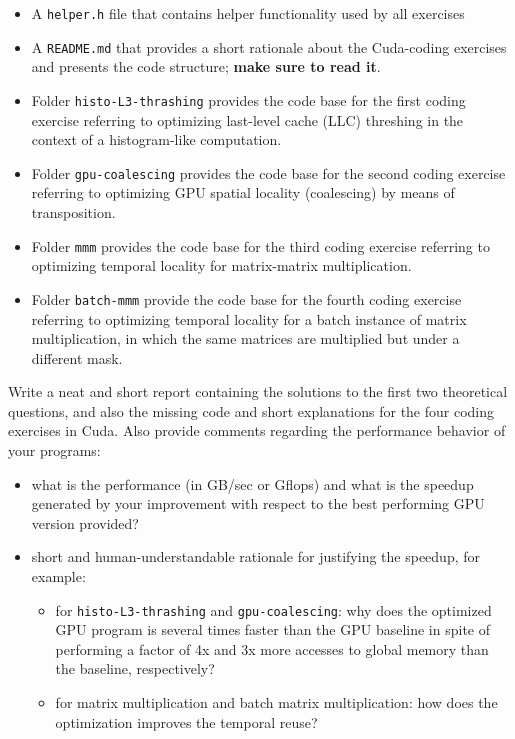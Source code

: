 \documentclass{article}
\begin{document}
\begin{itemize}
    \item A \texttt{helper.h} file that contains helper functionality used by all exercises
    \item A \texttt{README.md} that provides a short rationale about the Cuda-coding exercises and presents the code structure; \textbf{make sure to read it}.
    \item Folder \texttt{histo-L3-thrashing} provides the code base for the first coding exercise referring to optimizing last-level cache (LLC) threshing in the context of a histogram-like computation.
    \item Folder \texttt{gpu-coalescing} provides the code base for the second coding exercise referring to optimizing GPU spatial locality (coalescing) by means of transposition.
    \item Folder \texttt{mmm} provides the code base for the third coding exercise referring to optimizing temporal locality for matrix-matrix multiplication.
    \item Folder \texttt{batch-mmm} provide the code base for the fourth coding exercise referring to optimizing temporal locality for a batch instance of matrix multiplication, in which the same matrices are multiplied but under a different mask.
\end{itemize}

Write a neat and short report containing the solutions to the first two theoretical
questions, and also the missing code and short explanations for the four coding exercises in Cuda.
Also provide comments regarding the performance behavior of your programs:

\begin{itemize}
    \item what is the performance (in GB/sec or Gflops) and what is the speedup generated by your improvement with respect to the best performing GPU version provided? 
    \item short and human-understandable rationale for justifying the speedup, for example:
    \begin{itemize}
        \item for \texttt{histo-L3-thrashing} and \texttt{gpu-coalescing}: why does the optimized GPU program is several times faster than the GPU baseline in spite of performing a factor of 4x and 3x more accesses to global memory than the baseline, respectively?
        \item for matrix multiplication and batch matrix multiplication: how does the optimization improves the temporal reuse?
    \end{itemize}
\end{itemize}
\end{document}

